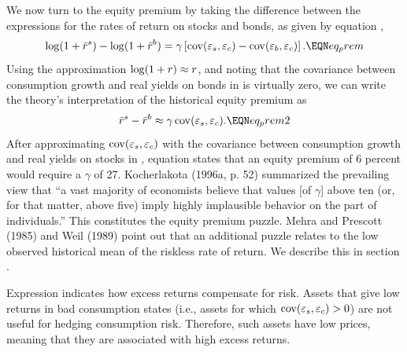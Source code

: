 We now turn to the equity premium by taking the difference between
the expressions for the rates of return on stocks and bonds, as given
by equation ,
$$
{\rm log}(1+ \bar r^s) - {\rm log}(1+ \bar r^b)
   = \gamma \left[ \cov(\varepsilon_{s}, \varepsilon_{c})
                   - \cov(\varepsilon_{b}, \varepsilon_{c}) \right].  \EQN eq_prem
$$
Using the approximation ${\rm log}(1+ r) \approx r$,
and noting that the covariance between consumption growth and real
yields on bonds in  is virtually zero, we can write the theory's
interpretation of the historical equity premium as
$$
\bar r^s - \bar r^b \approx \gamma \,\cov(\varepsilon_{s}, \varepsilon_{c}).
                                                                 \EQN eq_prem2
$$
After approximating ${\rm cov}(\varepsilon_{s}, \varepsilon_{c})$ with the covariance
between consumption growth and real yields on stocks in ,
equation  states that an equity premium of 6 percent would
require a $\gamma$ of 27. Kocherlakota (1996a, p. 52) summarized the prevailing
view that ``a vast majority of economists believe that values [of $\gamma$]
above ten (or, for that matter, above five) imply highly implausible behavior
on the part of individuals.''
This constitutes the equity premium puzzle.
Mehra and Prescott (1985) and Weil (1989) point out that an additional
puzzle relates to the low observed historical mean of the riskless rate of return.
We describe this {\it {}} in section .%

Expression  indicates how excess returns compensate for  risk.  Assets
that give low returns in bad consumption states (i.e., assets for which ${\rm cov}(\varepsilon_{s}, \varepsilon_{c}) > 0$)
are not useful for hedging consumption risk.  Therefore, such assets have low prices, meaning that they are associated
with high excess returns.

